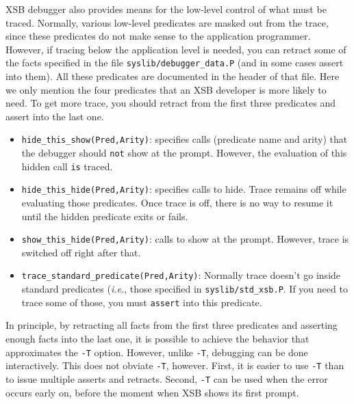 XSB debugger also provides means for the low-level control of what must be
traced. Normally, various low-level predicates are masked out from the
trace, since these predicates do not make sense to the application programmer.
However, if tracing below the application level is needed, you can retract
some of the facts specified in the file {\tt syslib/debugger\_data.P}
(and in some cases assert into them). All these predicates are documented
in the header of that file. Here we only mention the four predicates that an
XSB developer is more likely to need. To get more trace, you should retract
from the first three predicates and assert into the last one.
\begin{itemize}
\item {\tt hide\_this\_show(Pred,Arity)}: specifies calls (predicate name and
  arity) that the debugger should {\tt not} show at the prompt. However,
  the evaluation of this hidden call {\tt is} traced.
\item {\tt hide\_this\_hide(Pred,Arity)}: specifies calls to hide. Trace
  remains off while evaluating those predicates. Once trace is off, there
  is no way to resume it until the hidden predicate exits or fails.
\item  {\tt show\_this\_hide(Pred,Arity)}: calls to show at the
  prompt. However, trace is switched off right after that.
\item  {\tt trace\_standard\_predicate(Pred,Arity)}: Normally trace doesn't
  go inside standard predicates ({\it i.e.}, those specified in
  {\tt syslib/std\_xsb.P}. If you need to trace some of those, you must
  {\tt assert} into this predicate.
\end{itemize}
In principle, by retracting all facts from the first three predicates and
asserting enough facts into the last one, it is possible to achieve the
behavior that approximates the {\tt -T} option. However, unlike {\tt -T},
debugging can be done interactively. This does not obviate {\tt -T},
however. First, it is easier to use {\tt -T} than to issue multiple asserts
and retracts. Second, {\tt -T} can be used when the error occurs early on,
before the moment when XSB shows its first prompt.


